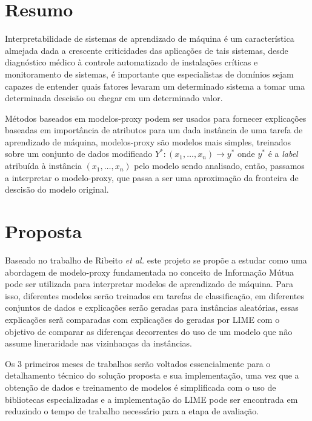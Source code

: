 \documentclass{article}
\begin{document}
\section*{Resumo}
\label{sec:resumo}
Interpretabilidade de sistemas de aprendizado de máquina é um
característica almejada dada a crescente criticidades das aplicações
de tais sistemas, desde diagnóstico médico à controle automatizado
de instalações críticas e monitoramento de sistemas, é importante que
especialistas de domínios sejam capazes de entender quais fatores
levaram um determinado sistema a tomar uma determinada descisão ou
chegar em um determinado valor.

Métodos baseados em modelos-proxy podem ser usados para fornecer
explicações baseadas em importância de atributos para um dada instância
de uma tarefa de aprendizado de máquina, modelos-proxy são modelos
mais simples, treinados sobre um conjunto de dados modificado $Y^*:
(x_1,\dots,x_n) \rightarrow y^*$
onde $y^*$ é a \textit{label} atribuída à instância $(x_1,\dots,x_n)$ pelo
modelo sendo analisado, então, passamos a interpretar o modelo-proxy, que passa
a ser uma aproximação da fronteira de descisão do modelo original.

\section*{Proposta}
\label{sec:proposta}

Baseado no trabalho de Ribeito \textit{et al.}\cite{lime} este projeto se propõe
a estudar como uma abordagem de modelo-proxy fundamentada no conceito
de Informação Mútua pode ser utilizada para interpretar modelos de aprendizado
de máquina. Para isso, diferentes modelos serão treinados em tarefas de
classificação, em diferentes conjuntos de dados e explicações serão geradas
para instâncias aleatórias, essas explicações serã comparadas com explicações do
geradas por LIME \cite{lime} com o objetivo de comparar as diferenças
decorrentes do uso de um modelo que não assume lineraridade nas vizinhanças
da instâncias.

Os 3 primeiros meses de trabalhos serão voltados essencialmente para o detalhamento
técnico do solução proposta e sua implementação, uma vez que a obtenção de
dados e treinamento de modelos é simplificada com o uso de bibliotecas
especializadas e a implementação do LIME pode ser encontrada em \cite{lime}
reduzindo o tempo de trabalho necessário para a etapa de avaliação.

{}

\end{document}
